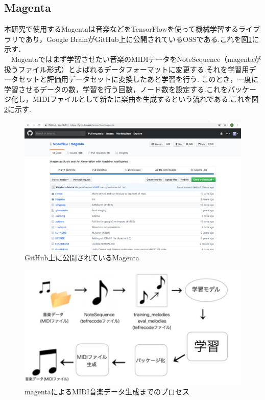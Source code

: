 \subsection{Magenta}
本研究で使用するMagentaは音楽などをTensorFlowを使って機械学習するライブラリであり，Google BrainがGitHub上に公開されているOSSである.これを図\ref{fig:GitHub上に公開されているMagenta}に示す．\\
　Magentaではまず学習させたい音楽のMIDIデータをNoteSequence（magentaが扱うファイル形式）とよばれるデータフォーマットに変更する.それを学習用データセットと評価用データセットに変換したあと学習を行う.
このとき，一度に学習させるデータの数，学習を行う回数，ノード数を設定する.これをパッケージ化し，MIDIファイルとして新たに楽曲を生成するという流れである.これを図\ref{fig:magentaによるMIDI音楽データ生成までのプロセス}に示す.
\begin{figure}[h]
    \begin{screen}
    \begin{center}
        \includegraphics[scale=0.3, clip]{./img/magentagithub.png}
        \caption{GitHub上に公開されているMagenta}
        \label{fig:GitHub上に公開されているMagenta}
    \end{center}
    \end{screen}
\end{figure}
\newpage
\begin{figure}[h]
    \begin{screen}
    \begin{center}
        \includegraphics[scale=1.7, clip]{./img/magenta_usestep.png}
        \caption{magentaによるMIDI音楽データ生成までのプロセス}
        \label{fig:magentaによるMIDI音楽データ生成までのプロセス}
    \end{center}
    \end{screen}
\end{figure}
